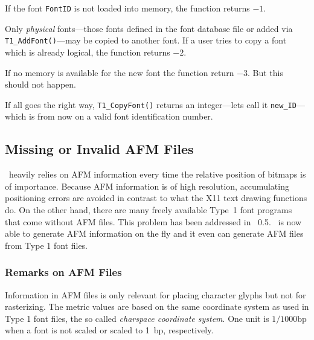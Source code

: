 If the font \verb+FontID+ is not loaded into memory, the function returns $-1$.

Only {\em physical} fonts---those fonts defined in the font database
file or added via \verb+T1_AddFont()+---may be copied to another
font. If a user tries to copy a font 
which is already logical, the function returns $-2$.

If no memory is available for the new font the function return $-3$. But
this should not happen. 

If all goes the right way, \verb+T1_CopyFont()+ returns an integer---lets call
it \verb+new_ID+---which is from now on a valid font identification number.

\subsection{Missing or Invalid AFM Files}
\label{missingafmfiles}%
\tonelib\ heavily relies on AFM information every time the relative position
of bitmaps is of importance. Because AFM information is of high resolution,
accumulating positioning errors are avoided in contrast to what the X11 text
drawing functions do. On the other hand, there are many freely available
Type~1 font programs that come without AFM files. This problem has been
addressed in \tonelib\ 0.5. \tonelib\ is now able to generate AFM information
on the fly and it even can generate AFM files from Type 1 font files.

\subsubsection{Remarks on AFM Files}
\label{remarksonafmfiles}%
Information in AFM files is only relevant for placing character glyphs but not
for rasterizing. The metric values are based on the same coordinate system as
used in Type 1 font files, the so called {\em charspace coordinate system}. 
One unit is $1/1000 \mbox{bp}$ when a font is not scaled or scaled to 1~bp,
respectively. 

